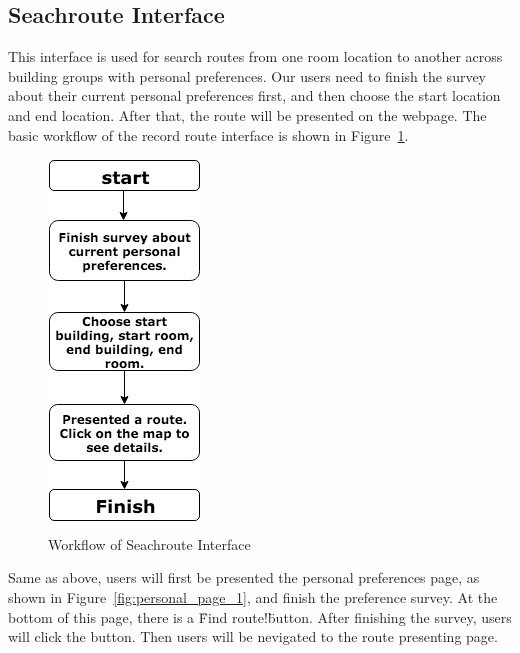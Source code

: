 \documentclass{sigchi}
\begin{document}
\subsection{Seachroute Interface}
This interface is used for search routes from one room location to another across building groups with personal preferences. Our users need to finish the survey about their current personal preferences first, and then choose the start location and end location. After that, the route will be presented on the webpage. The basic workflow of the record route interface is shown in Figure~\ref{fig:find-uiflow}.

\begin{figure}[!h]
\centering
\includegraphics[width=0.4\columnwidth]{pics/find-uiflow.png}
\caption{Workflow of Seachroute Interface}
\label{fig:find-uiflow}
\end{figure}


Same as above, users will first be presented the personal preferences page, as shown in Figure~\ref{fig:personal_page_1}, and finish the preference survey. At the bottom of this page, there is a \"Find route!\" button. After finishing the survey, users will click the button. Then users will be nevigated to the route presenting page.
\end{document}
